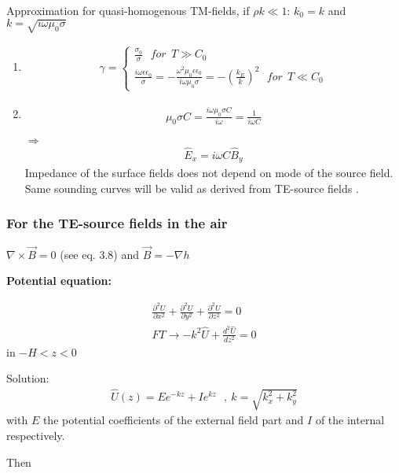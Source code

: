 Approximation for quasi-homogenous TM-fields, if $\rho k \ll 1$: $k_0=k$ and $k=\sqrt{i\omega\mu_0\sigma}$

\begin{enumerate}
\item 
\begin{align*}
\gamma=\begin{cases}
\frac{\sigma_0}{\sigma} ~~~for~~ T\gg C_0\\
\frac{i\omega\epsilon\epsilon_0}{\sigma}=-\frac{\omega^2\mu_0\epsilon\epsilon_0}{i\omega\mu_0\sigma}=-\left(\frac{k_E}{k}\right)^2 ~~~ for~~T\ll C_0
\end{cases}
\end{align*}

\item
\begin{align*}
\mu_0\sigma C=\frac{i\omega\mu_0\sigma C}{i\omega}=\frac{1}{i\omega C}
\end{align*}

$\Rightarrow$
\begin{align}
\hat{E}_x=i\omega C \hat{B}_y
\end{align}
Impedance of the surface fields does not depend on mode of the source field. Same sounding curves will be valid as derived from TE-source fields .

\end{enumerate}



\subsubsection*{For the TE-source fields in the air}

$\nabla\times\vec{B}=0$ (see eq. 3.8) and $\vec{B}=-\nabla h$

\textbf{Potential equation:} 

\begin{align*}
\frac{\partial^2 U}{\partial x^2}+\frac{\partial^2 U}{\partial y^2}+\frac{\partial^2 U}{\partial z^2}=0\\
FT \rightarrow -k^2\hat{U}+\frac{d^2\hat{U}}{dz^2}=0
\end{align*}
in $-H<z<0$

Solution:
\begin{align*}
\hat{U}(z)=Ee^{-kz}+Ie^{kz} ~~~,~k=\sqrt{k_x^2+k_y^2}
\end{align*}
with $E$ the potential coefficients of the external field part and $I$ of the internal respectively.

Then


